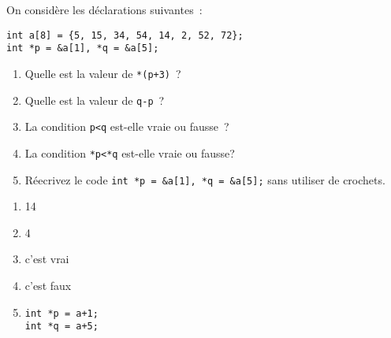 On consid\`ere les d\'eclarations suivantes~:
\begin{verbatim}
int a[8] = {5, 15, 34, 54, 14, 2, 52, 72};
int *p = &a[1], *q = &a[5];
\end{verbatim}
\begin{enumerate}
\item Quelle est la valeur de \verb?*(p+3)?~?
\item Quelle est la valeur de \verb?q-p?~?
\item La condition \verb+p<q+ est-elle vraie ou fausse~?
\item La condition \verb+*p<*q+ est-elle vraie ou fausse?
\item R\'eecrivez le code \verb+int *p = &a[1], *q = &a[5];+ sans
  utiliser de crochets.
\end{enumerate}
\ifcorrection
\begin{correction}
\begin{enumerate}
\item 14
\item  4
\item c'est vrai
\item c'est faux
\item 
\begin{verbatim}
int *p = a+1;
int *q = a+5;
\end{verbatim}
\end{enumerate}
\end{correction}
\fi

